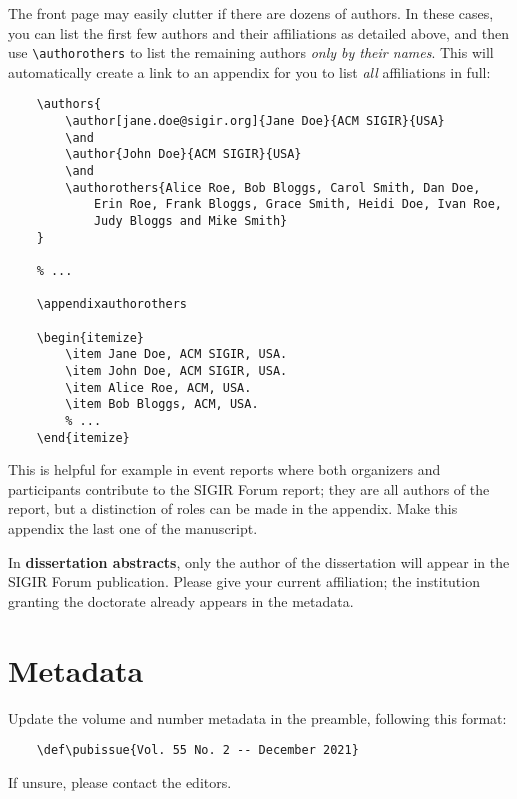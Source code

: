 \documentclass[news]{sigirforum}
\def\pubissue{v1.2 -- Jun 2023}
\begin{document}
The front page may easily clutter if there are dozens of authors. In these cases, you can list the first few authors and their affiliations as detailed above, and then use \texttt{\textbackslash authorothers} to list the remaining authors \textsl{only by their names}. This will automatically create a link to an appendix for you to list \textsl{all} affiliations in full:
\begin{verbatim}
    \authors{
        \author[jane.doe@sigir.org]{Jane Doe}{ACM SIGIR}{USA}
        \and
        \author{John Doe}{ACM SIGIR}{USA}
        \and
        \authorothers{Alice Roe, Bob Bloggs, Carol Smith, Dan Doe,
            Erin Roe, Frank Bloggs, Grace Smith, Heidi Doe, Ivan Roe,
            Judy Bloggs and Mike Smith}
    }
    
    % ...
    
    \appendixauthorothers
    
    \begin{itemize}
        \item Jane Doe, ACM SIGIR, USA.
        \item John Doe, ACM SIGIR, USA.
        \item Alice Roe, ACM, USA.
        \item Bob Bloggs, ACM, USA.
        % ...
    \end{itemize}
\end{verbatim}
This is helpful for example in event reports where both organizers and participants contribute to the SIGIR Forum report; they are all authors of the report, but a distinction of roles can be made in the appendix. Make this appendix the last one of the manuscript.

In \textbf{dissertation abstracts}, only the author of the dissertation will appear in the SIGIR Forum publication. Please give your current affiliation; the institution granting the doctorate already appears in the metadata.

\section{Metadata}

Update the volume and number metadata in the preamble, following this format:
\begin{verbatim}
    \def\pubissue{Vol. 55 No. 2 -- December 2021}
\end{verbatim}
If unsure, please contact the editors.
\end{document}

